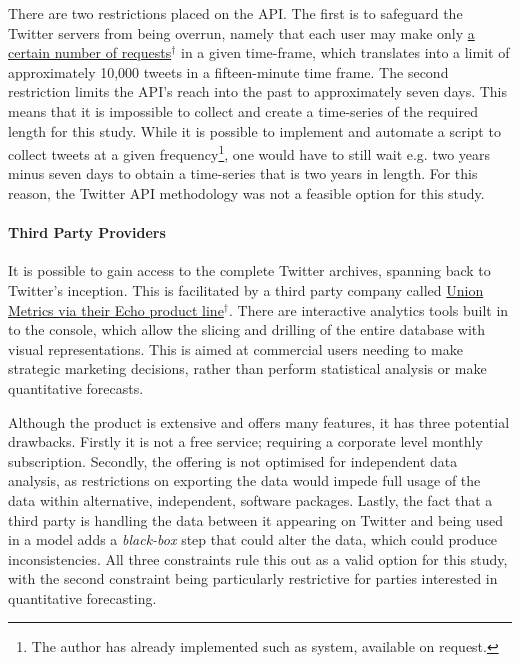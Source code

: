 \documentclass{article}
\begin{document}
There are two restrictions placed on the API. The first is to safeguard the Twitter servers from being overrun, namely that each user may make only \href{https://dev.twitter.com/rest/public/rate-limits}{a certain number of requests$^{\dag{}}$} in a given time-frame, which translates into a limit of approximately 10,000 tweets in a fifteen-minute time frame. The second restriction limits the API's reach into the past to approximately seven days. This means that it is impossible to collect and create a time-series of the required length for this study. While it is possible to implement and automate a script to collect tweets at a given frequency\footnote{The author has already implemented such as system, available on request.}, one would have to still wait e.g. two years minus seven days to obtain a time-series that is two years in length. For this reason, the Twitter API methodology was not a feasible option for this study.



\paragraph{Third Party Providers}
\label{sec-3-2-3-2}
It is possible to gain access to the complete Twitter archives, spanning back to Twitter's inception. This is facilitated by a third party company called \href{https://unionmetrics.com/product/echo-twitter-archive-search/}{Union Metrics via their Echo product line$^{\dag{}}$}. There are interactive analytics tools built in to the console, which allow the slicing and drilling of the entire database with visual representations. This is aimed at commercial users needing to make strategic marketing decisions, rather than perform statistical analysis or make quantitative forecasts.

Although the product is extensive and offers many features, it has three potential drawbacks. Firstly it is not a free service; requiring a corporate level monthly subscription. Secondly, the offering is not optimised for independent data analysis, as restrictions on exporting the data would impede full usage of the data within alternative, independent, software packages. Lastly, the fact that a third party is handling the data between it appearing on Twitter and being used in a model adds a \emph{black-box} step that could alter the data, which could produce inconsistencies. All three constraints rule this out as a valid option for this study, with the second constraint being particularly restrictive for parties interested in quantitative forecasting.
\end{document}
